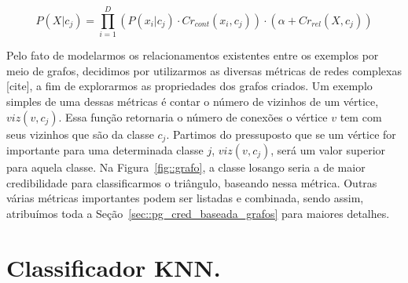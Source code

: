 \begin{equation}\label{eqn::nbcredcompleta}
P(X|c_{j}) = \prod^{D}_{i=1}{(P(x_i|c_j) \cdot Cr_{cont}(x_i,c_j)) \cdot (\alpha + Cr_{rel}(X,c_j)) } 
\end{equation}

Pelo fato de modelarmos os relacionamentos existentes entre os exemplos por meio de grafos, decidimos por utilizarmos as diversas métricas de redes complexas [cite], a fim de explorarmos as propriedades dos grafos criados. Um exemplo simples de uma dessas métricas é contar o número de vizinhos de um vértice, $viz(v,c_j)$. Essa função retornaria o número de conexões o vértice $v$ tem com seus vizinhos que são da classe $c_j$. Partimos do pressuposto que se um vértice for importante para uma determinada classe $j$, $viz(v,c_j)$, será um valor superior para aquela classe. Na Figura~\ref{fig::grafo}, a classe losango seria a de maior credibilidade para classificarmos o triângulo, baseando nessa métrica. Outras várias métricas importantes podem ser listadas e combinada, sendo assim, atribuímos toda a Seção~\ref{sec::pg_cred_baseada_grafos} para maiores detalhes.  



\section{Classificador \textsc{KNN}.}
\label{subsec::cred_knn}



